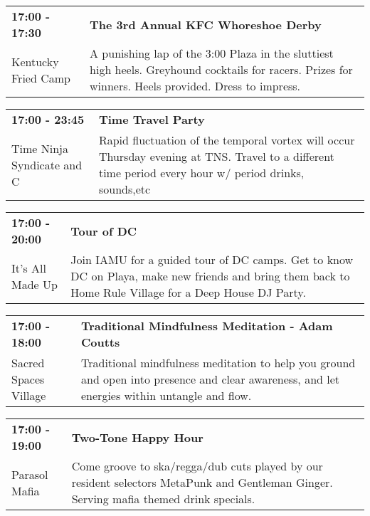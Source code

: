 \begin{tabular}{ p{1in} p{2.2in} }
    \textbf{17:00 - 17:30} & \textbf{The 3rd Annual KFC Whoreshoe Derby} \\
    Kentucky Fried Camp \newline  & A punishing lap of the 3:00 Plaza in the sluttiest high heels. Greyhound cocktails for racers. Prizes for winners. Heels provided. Dress to impress. \\
    \hline 
\end{tabular}
    
\begin{tabular}{ p{1in} p{2.2in} }
    \textbf{17:00 - 23:45} & \textbf{Time Travel Party} \\
    Time Ninja Syndicate \newline 7 and C & Rapid fluctuation of the temporal vortex will occur Thursday evening at TNS. Travel to a different time period every hour w/ period drinks, sounds,etc \\
    \hline 
\end{tabular}
    
\begin{tabular}{ p{1in} p{2.2in} }
    \textbf{17:00 - 20:00} & \textbf{Tour of DC} \\
    It's All Made Up \newline  & Join IAMU for a guided tour of DC camps. Get to know DC on Playa, make new friends and bring them back to Home Rule Village for a Deep House DJ Party. \\
    \hline 
\end{tabular}
    
\begin{tabular}{ p{1in} p{2.2in} }
    \textbf{17:00 - 18:00} & \textbf{Traditional Mindfulness Meditation - Adam Coutts} \\
    Sacred Spaces Village \newline  & Traditional mindfulness meditation to help you ground and open into presence and clear awareness, and let energies within untangle and flow. \\
    \hline 
\end{tabular}
    
\begin{tabular}{ p{1in} p{2.2in} }
    \textbf{17:00 - 19:00} & \textbf{Two-Tone Happy Hour} \\
    Parasol Mafia \newline  & Come groove to ska/regga/dub cuts played by our resident selectors MetaPunk and Gentleman Ginger. Serving mafia themed drink specials. \\
    \hline 
\end{tabular}
    
